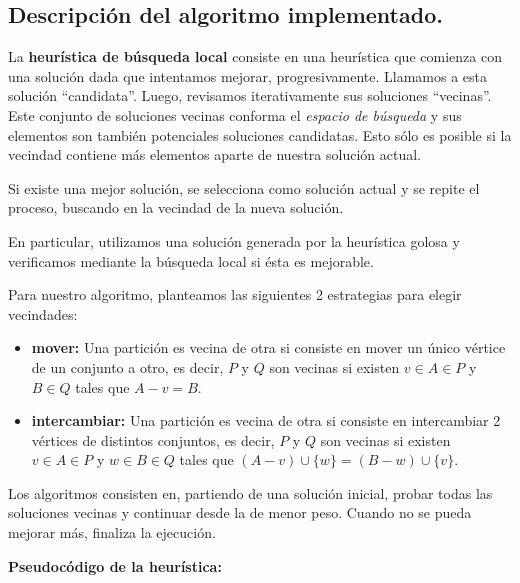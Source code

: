 \subsection{Descripción del algoritmo implementado.}
\vspace*{0.3cm}

La \textbf{heurística de búsqueda local} consiste en una heurística que
comienza con una solución dada que intentamos mejorar, progresivamente. Llamamos a esta solución ``candidata''. Luego, revisamos iterativamente sus soluciones ``vecinas''. Este conjunto de soluciones vecinas conforma el
\textit{espacio de búsqueda} y sus elementos son también potenciales soluciones candidatas. Esto sólo es posible si la vecindad contiene más elementos aparte de nuestra solución actual.

Si existe una mejor solución, se selecciona como solución actual y se repite el proceso, buscando en la vecindad de la nueva solución.

En particular, utilizamos una solución generada por la heurística golosa y verificamos mediante la búsqueda local si ésta es mejorable.

\vspace*{0.3cm}

Para nuestro algoritmo, planteamos las siguientes 2 estrategias para elegir vecindades:

\begin{itemize}
    \item \textbf{mover:} Una partición es vecina de otra si consiste en mover un único vértice de un conjunto a otro, es decir, $P$ y $Q$ son vecinas si existen $v \in A \in P$ y $B \in Q$ tales que $A - v = B$.

    \item \textbf{intercambiar:} Una partición es vecina de otra si consiste en intercambiar 2 vértices de distintos conjuntos, es decir, $P$ y $Q$ son vecinas si existen $v \in A \in P$ y $w \in B \in Q$ tales que $(A - v) \cup \{w\} = (B - w) \cup \{v\}$.
\end{itemize}

Los algoritmos consisten en, partiendo de una solución inicial, probar todas las soluciones vecinas y continuar desde la de menor peso. Cuando no se pueda mejorar más, finaliza la ejecución.

\vspace*{0.5cm}

\textbf{Pseudocódigo de la heurística:}

\vspace*{0.3cm}

